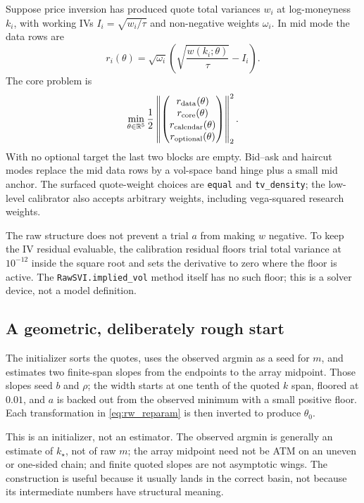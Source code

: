 \documentclass[11pt]{article}
\newcommand{\kmin}{k_\star}
\begin{document}
Suppose price inversion has produced quote total variances $w_i$ at
log-moneyness $k_i$, with working IVs $I_i=\sqrt{w_i/\tau}$ and non-negative
weights $\omega_i$.  In mid mode the data rows are
\begin{equation}
r_i(\theta)=\sqrt{\omega_i}
\left(\sqrt{\frac{w(k_i;\theta)}{\tau}}-I_i\right).
\label{eq:rw_data_rows}
\end{equation}
The core problem is
\begin{equation}
\min_{\theta\in\mathbb{R}^5}\frac12
\left\|
\begin{pmatrix}
r_{\rm data}(\theta)\\ r_{\rm core}(\theta)\\
r_{\rm calendar}(\theta)\\ r_{\rm optional}(\theta)
\end{pmatrix}
\right\|_2^2.
\label{eq:rw_objective}
\end{equation}
With no optional target the last two blocks are empty.  Bid--ask and haircut
modes replace the mid data rows by a vol-space band hinge plus a small mid
anchor.  The surfaced quote-weight choices are \texttt{equal} and
\texttt{tv\_density}; the low-level calibrator also accepts arbitrary weights,
including vega-squared research weights.

The raw structure does not prevent a trial $a$ from making $w$ negative.  To
keep the IV residual evaluable, the calibration residual floors trial total
variance at $10^{-12}$ inside the square root and sets the derivative to zero
where the floor is active.  The \texttt{RawSVI.implied\_vol} method itself has
no such floor; this is a solver device, not a model definition.

\subsection{A geometric, deliberately rough start}

The initializer sorts the quotes, uses the observed argmin as a seed for $m$,
and estimates two finite-span slopes from the endpoints to the array midpoint.
Those slopes seed $b$ and $\rho$; the width starts at one tenth of the quoted
$k$ span, floored at $0.01$, and $a$ is backed out from the observed minimum
with a small positive floor.  Each transformation in \eqref{eq:rw_reparam} is
then inverted to produce $\theta_0$.

This is an initializer, not an estimator.  The observed argmin is generally an
estimate of $\kmin$, not of raw $m$; the array midpoint need not be ATM on an
uneven or one-sided chain; and finite quoted slopes are not asymptotic wings.
The construction is useful because it usually lands in the correct basin, not
because its intermediate numbers have structural meaning.
\end{document}
